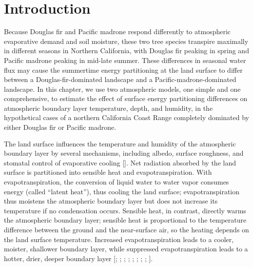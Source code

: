 \section{Introduction}

Because Douglas fir and Pacific madrone respond differently to atmospheric evaporative demand and soil moisture, these two tree species transpire maximally in different seasons in Northern California, with Douglas fir peaking in spring and Pacific madrone peaking in mid-late summer.  These differences in seasonal water flux may cause the summertime energy partitioning at the land surface to differ between a Douglas-fir-dominated landscape and a Pacific-madrone-dominated landscape.  In this chapter, we use two atmospheric models, one simple and one comprehensive, to estimate the effect of surface energy partitioning differences on atmospheric boundary layer temperature, depth, and humidity, in the hypothetical cases of a northern California Coast Range completely dominated by either Douglas fir or Pacific madrone.

The land surface influences the temperature and humidity of the atmospheric boundary layer by several mechanisms, including albedo, surface roughness, and stomatal control of evaporative cooling [\cite{bonan}].  Net radiation absorbed by the land surface is partitioned into sensible heat and evapotranspiration.  With evapotranspiration, the conversion of liquid water to water vapor consumes energy (called ``latent heat''), thus cooling the land surface; evapotranspiration thus moistens the atmospheric boundary layer but does not increase its temperature if no condensation occurs.  Sensible heat, in contrast, directly warms the atmospheric boundary layer; sensible heat is proportional to the temperature difference between the ground and the near-surface air, so the heating depends on the land surface temperature.  Increased evapotranspiration leads to a cooler, moister, shallower boundary layer, while suppressed evapotranspiration leads to a hotter, drier, deeper boundary layer [\cite{bonan}; \cite{seneviratne2010investigating}; \cite{de2012modelled}; \cite{fischer2007soil}; \cite{lobell2008effect}; \cite{mueller2012hot}; \cite{durre2000dependence}; \cite{hirschi2010observational}; \cite{Lee:2005kx}].  

